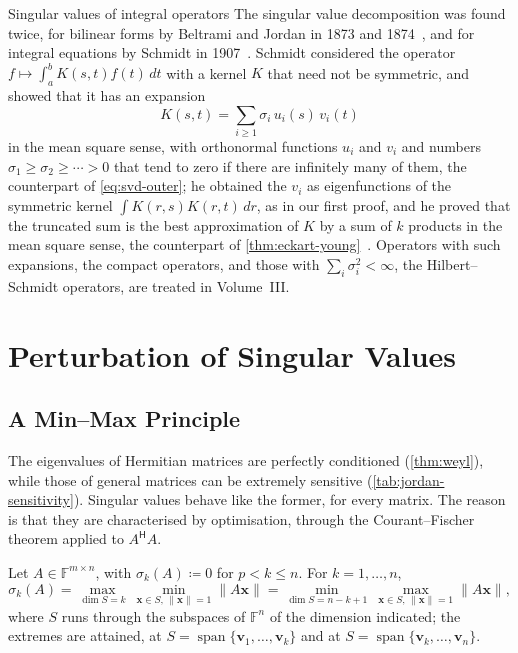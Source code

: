 \begin{note}{Singular values of integral operators}
The singular value decomposition was found twice, for bilinear forms by Beltrami and Jordan in 1873 and 1874~\cite{beltrami1873,jordan1874}, and for integral equations by Schmidt in 1907~\cite{schmidt1907}. Schmidt considered the operator $f\mapsto\int_a^bK(s,t)f(t)\,dt$ with a kernel $K$ that need not be symmetric, and showed that it has an expansion
\[
K(s,t)=\sum_{i\ge1}\sigma_i\,u_i(s)\,v_i(t)
\]
in the mean square sense, with orthonormal functions $u_i$ and $v_i$ and numbers $\sigma_1\ge\sigma_2\ge\cdots>0$ that tend to zero if there are infinitely many of them, the counterpart of \eqref{eq:svd-outer}; he obtained the $v_i$ as eigenfunctions of the symmetric kernel $\int K(r,s)K(r,t)\,dr$, as in our first proof, and he proved that the truncated sum is the best approximation of $K$ by a sum of $k$ products in the mean square sense, the counterpart of \cref{thm:eckart-young}~\cite{stewart1993}. Operators with such expansions, the compact operators, and those with $\sum_i\sigma_i^2<\infty$, the Hilbert--Schmidt operators, are treated in Volume~III.
\end{note}

\section{Perturbation of Singular Values}
\label{sec:svd-perturbation}

\subsection{A Min--Max Principle}

The eigenvalues of Hermitian matrices are perfectly conditioned (\cref{thm:weyl}), while those of general matrices can be extremely sensitive (\cref{tab:jordan-sensitivity}). Singular values behave like the former, for every matrix. The reason is that they are characterised by optimisation, through the Courant--Fischer theorem applied to $A^{\mathsf H}A$.

\begin{theorem}
\label{thm:svd-minmax}
Let $A\in\mathbb F^{m\times n}$, with $\sigma_k(A)\coloneqq0$ for $p<k\le n$. For $k=1,\ldots,n$,
\[
\sigma_k(A)=\max_{\dim S=k}\ \min_{\mathbf x\in S,\,\|\mathbf x\|=1}\|A\mathbf x\|=\min_{\dim S=n-k+1}\ \max_{\mathbf x\in S,\,\|\mathbf x\|=1}\|A\mathbf x\|,
\]
where $S$ runs through the subspaces of $\mathbb F^n$ of the dimension indicated; the extremes are attained, at $S=\operatorname{span}\{\mathbf v_1,\ldots,\mathbf v_k\}$ and at $S=\operatorname{span}\{\mathbf v_k,\ldots,\mathbf v_n\}$.
\end{theorem}

